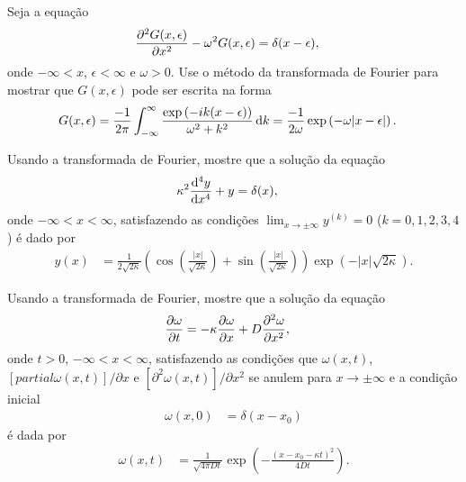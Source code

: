 \documentclass[a4paper,12pt, leqno, answers]{exam}
\begin{document}
\thispagestyle{empty}

\newpage
\setcounter{page}{1}
\begin{questions}
    \question Seja a equação
    \begin{align*}
        \frac{\partial ^2 G(x, \epsilon)}{\partial x^2} - \omega^2 G(x, \epsilon) &= \delta(x -
        \epsilon),
    \end{align*}
    onde $-\infty < x$, $\epsilon < \infty$ e $\omega > 0$. Use o método da
    transformada de Fourier para mostrar que $G(x, \epsilon)$ pode ser escrita
    na forma
    \begin{align*}
        G(x, \epsilon) &= \frac{-1}{2\pi} \int_{-\infty}^\infty
        \frac{\exp\left( -i k (x - \epsilon) \right)}{\omega^2 + k^2} \, \mathrm{d}k =
        \frac{-1}{2 \omega} \exp\left( -\omega |x - \epsilon| \right).
    \end{align*}
    \begin{solution}
    \end{solution}

    \question Usando a transformada de Fourier, mostre que a solução da
    equação
    \begin{align*}
        \kappa^2 \frac{\mathrm{d} ^4 y}{\mathrm{d} x^4} + y &= \delta(x),
    \end{align*}
    onde $-\infty < x < \infty$, satisfazendo as condições $\lim_{x \to
    \pm\infty} y^{(k)} = 0$ ($k = 0, 1, 2, 3, 4$) é dado por
    \begin{align*}
        y(x) &= \frac{1}{2 \sqrt{2\kappa}} \left( \cos\left(
        \frac{|x|}{\sqrt{2\kappa}} \right) + \sin\left(
        \frac{|x|}{\sqrt{2\kappa}} \right) \right) \exp\left( -|x|
        \sqrt{2\kappa} \right).
    \end{align*}
    \begin{solution}
    \end{solution}

    \question Usando a transformada de Fourier, mostre que a solução da
    equação
    \begin{align*}
        \frac{\partial \omega}{\partial t} &= -\kappa \frac{\partial \omega}{\partial x} + D \frac{\partial ^2 \omega}{\partial x^2},
    \end{align*}
    onde $t > 0$, $-\infty < x < \infty$, satisfazendo as condições que
    $\omega(x, t)$, $\left[ partial \omega(x, t) \right] / \partial x$ e $\left[
    \partial^2 \omega(x, t) \right] / \partial x^2$ se anulem para $x \to \pm
    \infty$ e a condição inicial
    \begin{align*}
        \omega(x, 0) &= \delta(x - x_0)
    \end{align*}
    é dada por
    \begin{align*}
        \omega(x, t) &= \frac{1}{\sqrt{4 \pi D t}} \exp\left( -
        \frac{(x - x_0 - \kappa t)^2}{4 D t} \right).
    \end{align*}
    \begin{solution}
    \end{solution}


\end{questions}
\end{document}

